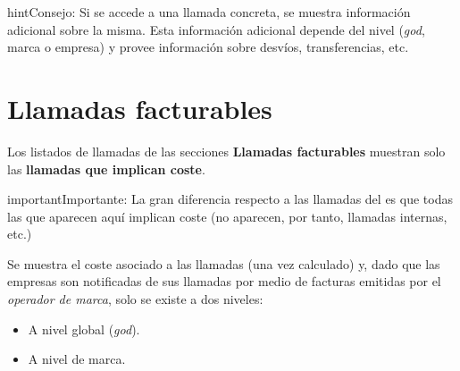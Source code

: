 \documentclass[letterpaper,10pt,spanish]{sphinxmanual}
\begin{document}
\begin{notice}{hint}{Consejo:}
Si se accede a una llamada concreta, se muestra información adicional sobre la misma. Esta información adicional depende del nivel (\emph{god}, marca o empresa) y provee información sobre desvíos, transferencias, etc.
\end{notice}


\section{Llamadas facturables}
\label{billing_and_invoices/billable_calls::doc}\label{billing_and_invoices/billable_calls:billable-calls}\label{billing_and_invoices/billable_calls:id1}
Los listados de llamadas de las secciones \textbf{Llamadas facturables} muestran solo las \textbf{llamadas que implican coste}.

\begin{notice}{important}{Importante:}
La gran diferencia respecto a las llamadas del {\hyperref[billing_and_invoices/call_registry:call\string-registry]{}} es que todas las que aparecen aquí implican coste (no aparecen, por tanto, llamadas internas, etc.)
\end{notice}

Se muestra el coste asociado a las llamadas (una vez calculado) y, dado que las empresas son notificadas de sus llamadas por medio de facturas emitidas por el \emph{operador de marca}, solo se existe a dos niveles:
\begin{itemize}
\item {} 
A nivel global (\emph{god}).

\item {} 
A nivel de marca.

\end{itemize}
\end{document}
